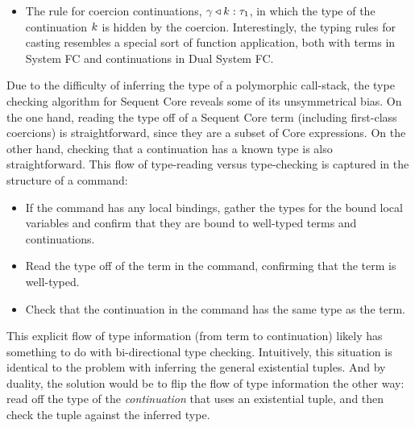 \documentclass{article}
\begin{document}
\begin{itemize}
\item The rule for coercion continuations, ${\gamma}\triangleleft{k} : \tau_1$, in which
  the type of the continuation $k$ is hidden by the coercion.  Interestingly,
  the typing rules for casting resembles a special sort of function application,
  both with terms in System FC and continuations in Dual System FC.
\end{itemize}

Due to the difficulty of inferring the type of a polymorphic call-stack, the
type checking algorithm for Sequent Core reveals some of its unsymmetrical bias.
On the one hand, reading the type off of a Sequent Core term (including
first-class coercions) is straightforward, since they are a subset of Core
expressions.  On the other hand, checking that a continuation has a known type
is also straightforward.  This flow of type-reading versus type-checking is
captured in the structure of a command:
\begin{itemize}
\item If the command has any local bindings, gather the types for the bound
  local variables and confirm that they are bound to well-typed terms and
  continuations.
\item Read the type off of the term in the command, confirming that the term is
  well-typed.
\item Check that the continuation in the command has the same type as the term.
\end{itemize}
This explicit flow of type information (from term to continuation) likely has
something to do with bi-directional type checking.  Intuitively, this situation
is identical to the problem with inferring the general existential tuples.  And
by duality, the solution would be to flip the flow of type information the other
way: read off the type of the \emph{continuation} that uses an existential
tuple, and then check the tuple against the inferred type.
\end{document}
